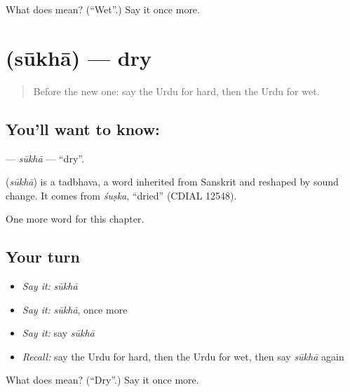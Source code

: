 \begin{tcolorbox}[breakable,colback=teal!4,colframe=teal!35!black,title={Before you move on}]
What does  mean? (\textquotedblleft{}Wet\textquotedblright{}.) Say it once more.
\end{tcolorbox}
\section[\texorpdfstring{\ur{سوکھا} (sūkhā)}{سوکھا (sūkhā)}]{ (sūkhā) — dry}

\label{lesson:UR-C134-sukha}



\begin{quote}
Before the new one: say the Urdu for hard, then the Urdu for wet.
\end{quote}

\subsection*{You'll want to know: }
\textbf{} — \emph{sūkhā} — \textquotedblleft{}dry\textquotedblright{}.

\begin{cousinweb}
\textbf{} (\emph{sūkhā}) is a tadbhava, a word inherited from Sanskrit and reshaped by sound change. It comes from \emph{śuṣka}, \textquotedblleft{}dried\textquotedblright{} (CDIAL 12548).
\end{cousinweb}

\begin{grammarlens}[title={What you've built}]
One more word for this chapter.
\end{grammarlens}

\subsection*{Your turn}
\begin{itemize}
\raggedright
  \item \emph{Say it:} \emph{sūkhā}
  \item \emph{Say it:} \emph{sūkhā}, once more
  \item \emph{Say it:} say \emph{sūkhā}
  \item \emph{Recall:} say the Urdu for hard, then the Urdu for wet, then say \emph{sūkhā} again
\end{itemize}

\begin{tcolorbox}[breakable,colback=teal!4,colframe=teal!35!black,title={Before you move on}]
What does  mean? (\textquotedblleft{}Dry\textquotedblright{}.) Say it once more.
\end{tcolorbox}
